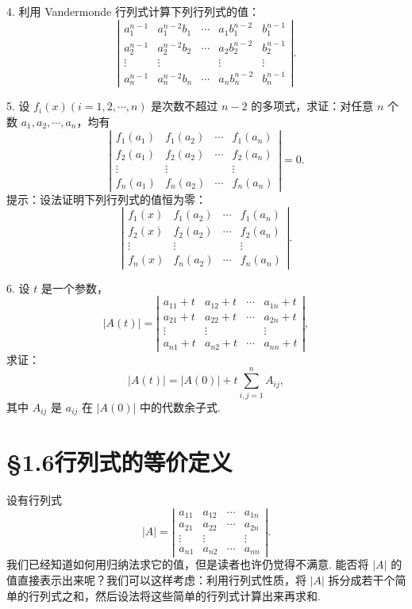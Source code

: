 \documentclass[UTF8, 12pt, fontset=fandol, oneside]{ctexart}
\begin{document}
4. 利用 Vandermonde 行列式计算下列行列式的值：
\[
\left|\begin{array}{ccccc}
a_1^{n-1} & a_1^{n-2}b_1 & \cdots & a_1b_1^{n-2} & b_1^{n-1}\\
a_2^{n-1} & a_2^{n-2}b_2 & \cdots & a_2b_2^{n-2} & b_2^{n-1}\\
\vdots & \vdots & & \vdots & \vdots\\
a_n^{n-1} & a_n^{n-2}b_n & \cdots & a_nb_n^{n-2} & b_n^{n-1}
\end{array}\right|.
\]

5. 设 $f_i(x)(i=1,2,\cdots,n)$ 是次数不超过 $n-2$ 的多项式，求证：对任意 $n$ 个数 $a_1,a_2,\cdots,a_n$，均有
\[
\left|\begin{array}{cccc}
f_1(a_1) & f_1(a_2) & \cdots & f_1(a_n)\\
f_2(a_1) & f_2(a_2) & \cdots & f_2(a_n)\\
\vdots & \vdots & & \vdots\\
f_n(a_1) & f_n(a_2) & \cdots & f_n(a_n)
\end{array}\right|=0.
\]
提示：设法证明下列行列式的值恒为零：
\[
\left|\begin{array}{cccc}
f_1(x) & f_1(a_2) & \cdots & f_1(a_n)\\
f_2(x) & f_2(a_2) & \cdots & f_2(a_n)\\
\vdots & \vdots & & \vdots\\
f_n(x) & f_n(a_2) & \cdots & f_n(a_n)
\end{array}\right|.
\]

6. 设 $t$ 是一个参数，
\[
|A(t)|=
\left|\begin{array}{cccc}
a_{11}+t & a_{12}+t & \cdots & a_{1n}+t\\
a_{21}+t & a_{22}+t & \cdots & a_{2n}+t\\
\vdots & \vdots & & \vdots\\
a_{n1}+t & a_{n2}+t & \cdots & a_{nn}+t
\end{array}\right|,
\]
求证：
\[
|A(t)|=|A(0)|+t\sum_{i,j=1}^n A_{ij},
\]
其中 $A_{ij}$ 是 $a_{ij}$ 在 $|A(0)|$ 中的代数余子式.

\section*{§1.6\quad 行列式的等价定义}

设有行列式
\begin{equation}
|A|=
\left|\begin{array}{cccc}
a_{11} & a_{12} & \cdots & a_{1n}\\
a_{21} & a_{22} & \cdots & a_{2n}\\
\vdots & \vdots & & \vdots\\
a_{n1} & a_{n2} & \cdots & a_{nn}
\end{array}\right|.
\tag{1.6.1}
\end{equation}
我们已经知道如何用归纳法求它的值，但是读者也许仍觉得不满意. 能否将 $|A|$ 的值直接表示出来呢？我们可以这样考虑：利用行列式性质，将 $|A|$ 拆分成若干个简单的行列式之和，然后设法将这些简单的行列式计算出来再求和.
\end{document}
